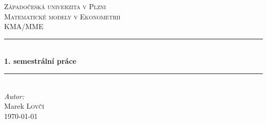 	
\linespread{1}

\begin{titlepage}
	
	\newcommand{\HRule}{\rule{\linewidth}{0.5mm}} %
	
	\center{} %
	 
	
	\textsc{\LARGE Západočeská univerzita v Plzni}\\[1.5cm] %
	\textsc{\Large Matematické modely v Ekonometrii}\\[0.5cm] %
	\textsc{\large KMA/MME}\\[0.5cm] %
	
	
	\HRule{} \\[0.4cm]
	{\huge \bfseries 1. semestrální práce}\\ %
	\HRule{} \\[1.5cm]
	 
	
	\Large \emph{Autor:}\\
	Marek \textsc{Lovčí}\\[3.3cm]
	
	
	{\large \today}\\[2cm] %
	
	

\end{titlepage}
